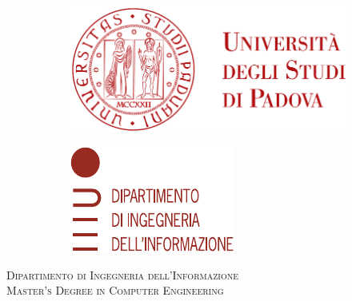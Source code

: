 \begin{titlepage}
	\begin{figure}
		\centering
		\begin{subfigure}[b]{0.4\textwidth}
			\includegraphics[width=\textwidth]{images/logo_unipd}
		\end{subfigure}
		\hfill
		\begin{subfigure}[b]{0.3\textwidth}
			\includegraphics[width=\textwidth]{images/logo_dei}
		\end{subfigure}
	\end{figure}


	\begin{center}
		\makeatletter %

		\textsc{Dipartimento di Ingegneria dell'Informazione}\\
		\textsc{Master's Degree in Computer Engineering}


\end{center}
\end{titlepage}
